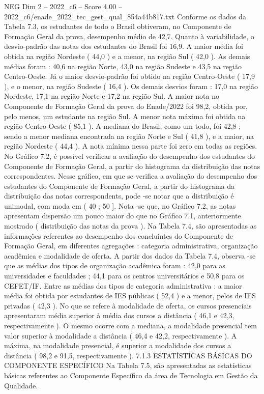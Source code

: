 \begin{textsample}{NEG Dim 2 – 2022\_c6 – Score 4.00 – 2022\_c6/enade\_2022\_tec\_gest\_qual\_854a44b817.txt}
Conforme os dados da Tabela 7.3, os estudantes de todo o Brasil obtiveram, no Componente de Formação Geral da prova, desempenho médio de 42,7.
Quanto à variabilidade, o desvio-padrão das notas dos estudantes do Brasil foi 16,9.
A maior média foi obtida na região Nordeste ( 44,0 ) e a menor, na região Sul ( 42,0 ).
As demais médias foram : 40,6 na região Norte, 43,0 na região Sudeste e 43,5 na região Centro-Oeste.
Já o maior desvio-padrão foi obtido na região Centro-Oeste ( 17,9 ), e o menor, na região Sudeste ( 16,4 ).
Os demais desvios foram : 17,0 na região Nordeste, 17,1 na região Norte e 17,2 na região Sul.
A maior nota no Componente de Formação Geral da prova do Enade/2022 foi 98,2, obtida por, pelo menos, um estudante na região Sul.
A menor nota máxima foi obtida na região Centro-Oeste ( 85,1 ).
A mediana do Brasil, como um todo, foi 42,8 ; sendo a menor mediana encontrada na região Norte e Sul ( 41,8 ), e a maior, na região Nordeste ( 44,4 ).
A nota mínima nessa parte foi zero em todas as regiões.
No Gráfico 7.2, é possível verificar a avaliação do desempenho dos estudantes do Componente de Formação Geral, a partir do histograma da distribuição das notas correspondentes.
Nesse gráfico, em que se verifica a avaliação do desempenho dos estudantes do Componente de Formação Geral, a partir do histograma da distribuição das notas correspondents, pode -se notar que a distribuição é unimodal, com moda em ( 40 ; 50 ].
Nota -se que, no Gráfico 7.2, as notas apresentam dispersão um pouco maior do que no Gráfico 7.1, anteriormente mostrado ( distribuição das notas da prova ).
Na Tabela 7.4, são apresentadas as informações referentes ao desempenho dos concluintes do Componente de Formação Geral, em diferentes agregações : categoria administrativa, organização acadêmica e modalidade de oferta.
A partir dos dados da Tabela 7.4, observa -se que as médias dos tipos de organização acadêmica foram : 42,0 para as universidades e faculdades ; 44,1 para os centros universitários e 50,8 para os CEFET/IF.
Entre as médias dos tipos de categoria administrativa : a maior média foi obtida por estudantes de IES públicas ( 52,4 ) e a menor, pelos de IES privadas ( 42,3 ).
No que se refere à modalidade de oferta, os cursos presenciais apresentaram média superior à média dos cursos a distância ( 46,1 e 42,3, respectivamente ).
O mesmo ocorre com a mediana, a modalidade presencial tem valor superior à modalidade a distância ( 46,4 e 42,2, respectivamente ).
A máxima, na modalidade presencial, é superior a modalidade dos cursos a distância ( 98,2 e 91,5, respectivamente ). 7.1.3 ESTATÍSTICAS BÁSICAS DO COMPONENTE ESPECÍFICO Na Tabela 7.5, são apresentadas as estatísticas básicas referentes ao Componente Específico da área de Tecnologia em Gestão da Qualidade.

\end{textsample}
